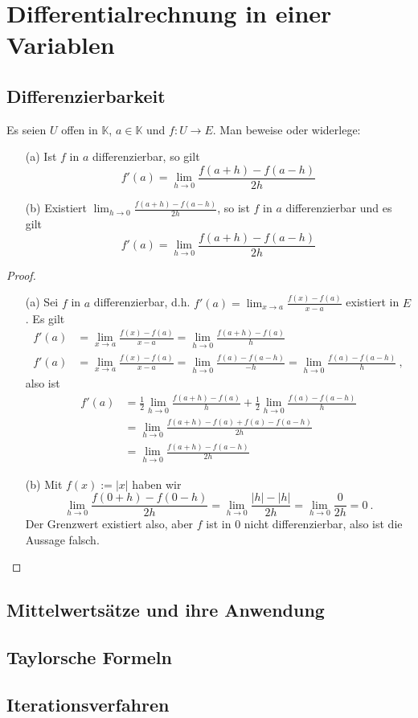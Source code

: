 \chapter{Differentialrechnung in einer Variablen}
\section{Differenzierbarkeit}
\setcounter{aufgabe}{8}
\begin{aufgabe}
Es seien $U$ offen in $\mathbb K$, $a \in \mathbb K$ und $f: U \to E$. Man beweise oder widerlege:
\begin{enumerate}
\item[(a)] Ist $f$ in $a$ differenzierbar, so gilt
    \[
         f'(a) = \lim_{h \to 0} \frac{f(a+h) - f(a-h)}{2h}
    \]
\item[(b)] Existiert $\lim_{h \to 0} \frac{f(a+h) - f(a-h)}{2h}$, so ist $f$ in $a$ differenzierbar und es gilt
    \[
        f'(a) = \lim_{h \to 0} \frac{f(a+h) - f(a-h)}{2h}
    \]
\end{enumerate}
\end{aufgabe}
\begin{proof}
    \begin{enumerate}
    \item[(a)]
    Sei $f$ in $a$ differenzierbar, d.h. $f'(a) = \lim_{x \to a} \frac{f(x) - f(a)}{x-a}$ existiert in $E$. Es gilt
    \begin{align*}
        f'(a) &= \lim_{x \to a} \frac{f(x) - f(a)}{x-a} = \lim_{h \to 0} \frac{ f(a+h) - f(a)}{h} \\
        f'(a) &= \lim_{x \to a} \frac{f(x) - f(a)}{x-a} = \lim_{h \to 0} \frac{ f(a) - f(a-h)}{-h} 
            = \lim_{h \to 0} \frac{f(a) - f(a-h)}{h} \ ,
    \end{align*}
    also ist
    \begin{align*}
        f'(a) &= \frac 1 2 \lim_{h \to 0} \frac{ f(a+h)- f(a)}{h} + \frac 1 2 \lim_{h \to 0} \frac{f(a) - f(a-h)}{h} \\
              &= \lim_{h \to 0} \frac{f(a+h) - f(a) + f(a) - f(a-h)}{2h} \\
              &= \lim_{h \to 0} \frac{f(a+h) - f(a-h)}{2h}
    \end{align*}
    \item[(b)]
        Mit $f(x) := |x|$ haben wir 
        \[
            \lim_{h \to 0} \frac{f(0+h) - f(0-h)}{2h} = \lim_{h \to 0} \frac{ |h| - |h|}{2h} = \lim_{h \to 0} \frac{0}{2h} = 0 \ .
        \]
        Der Grenzwert existiert also, aber $f$ ist in $0$ nicht differenzierbar, also ist die Aussage falsch.
    \end{enumerate}
\end{proof}

\section{Mittelwertsätze und ihre Anwendung}
\section{Taylorsche Formeln}
\section{Iterationsverfahren}
